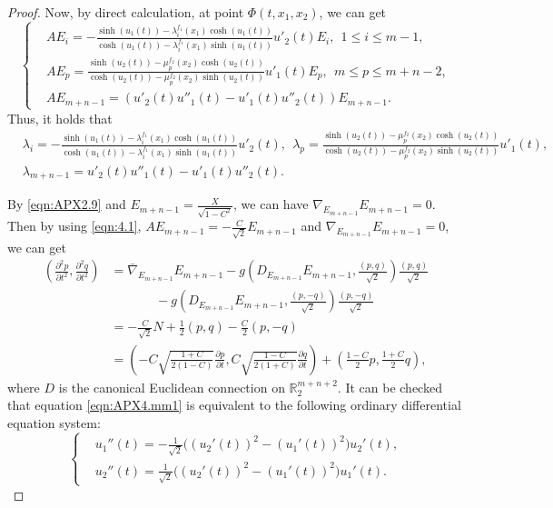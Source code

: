 \documentclass[reqno]{amsart}%
\theoremstyle{definition}
\numberwithin{equation}{section}
\begin{document}
\begin{proof}
Now, by direct calculation, at point $\Phi(t,x_1,x_2)$, we can get 
%
\begin{equation}\label{eqn:apx3.5}
	\left\{\begin{aligned}
		&AE_i=-\tfrac{\sinh(u_1(t))
			-\lambda^{f_1}_i(x_1)\cosh(u_1(t))}
		{\cosh(u_1(t))-\lambda^{f_1}_i(x_1)\sinh(u_1(t))}u'_{2}(t)E_i,\ \ 1\leq i\leq m-1,\\
		&AE_p=\tfrac{\sinh(u_2(t))
			-\mu^{f_2}_p(x_2)\cosh(u_2(t))}
		{\cosh(u_2(t))-\mu^{f_2}_p(x_2)\sinh(u_2(t))}u'_{1}(t)E_p,\ \ m\leq p\leq m+n-2,\\
		&AE_{m+n-1}=\left(u'_{2}(t)u''_{1}(t)-u'_{1}(t)u''_{2}(t)\right)E_{m+n-1}.
	\end{aligned}\right.
\end{equation}
Thus, it holds that 
%
\begin{equation}\label{eqn:apx3.5ss}
\begin{aligned}
&\lambda_i=-\tfrac{\sinh(u_1(t))
	-\lambda^{f_1}_i(x_1)\cosh(u_1(t))}
{\cosh(u_1(t))-\lambda^{f_1}_i(x_1)\sinh(u_1(t))}u'_{2}(t), \ \ \lambda_p=\tfrac{\sinh(u_2(t))
	-\mu^{f_2}_p(x_2)\cosh(u_2(t))}
{\cosh(u_2(t))-\mu^{f_2}_p(x_2)\sinh(u_2(t))}u'_{1}(t),\\
&\lambda_{m+n-1}=u'_{2}(t)u''_{1}(t)-u'_{1}(t)u''_{2}(t).
	\end{aligned}
\end{equation}

By \eqref{eqn:APX2.9} and $E_{m+n-1}=\tfrac{X}{\sqrt{1-C^2}}$, we can have 
 $\nabla_{E_{m+n-1}}{E_{m+n-1}}=0$. 
Then by using \eqref{eqn:4.1}, $AE_{m+n-1}=-\frac{C}{\sqrt{2}}E_{m+n-1}$ and $\nabla_{E_{m+n-1}}{E_{m+n-1}}=0$, 
we can get 
\begin{equation}\label{eqn:APX4.mm1}
	\begin{aligned}
		(\tfrac{\partial^2 p}{\partial t^2},\tfrac{\partial^2 q}{\partial t^2})&%
		=\bar{\nabla}_{E_{m+n-1}}{E_{m+n-1}}-g( D_{E_{m+n-1}}{E_{m+n-1}},\tfrac{(p,q)}{\sqrt{2}})\tfrac{(p,q)}{\sqrt{2}}\\
		&~~~~~~~~~~~~~~~~    -g( D_{E_{m+n-1}}{E_{m+n-1}},\tfrac{(p,-q)}{\sqrt{2}})\tfrac{(p,-q)}{\sqrt{2}}\\
		&=-\tfrac{C}{\sqrt{2}}N+\tfrac{1}{2}(p,q)-\tfrac{C}{2}(p,-q)\\
		&=(-C\sqrt{\tfrac{1+C}{2(1-C)}}\tfrac{\partial p}{\partial t},C\sqrt{\tfrac{1-C}{2(1+C)}}\tfrac{\partial q}{\partial t})+(\tfrac{1-C}{2}p,\tfrac{1+C}{2}q),
	\end{aligned}
\end{equation}
where $D$ is the canonical Euclidean connection on $\mathbb{R}_2^{m+n+2}$. 
It can be checked that equation \eqref{eqn:APX4.mm1} is equivalent to the following 
ordinary differential equation system:
\begin{equation}\label{eqn:APX4.mm1sx}
	\left\{\begin{aligned}
	&u_1''(t)=-\frac{1}{\sqrt{2}}\Big((u_2'(t))^2-(u_1'(t))^2\Big)u_2'(t),\\
	&u_2''(t)=\frac{1}{\sqrt{2}}\Big((u_2'(t))^2-(u_1'(t))^2\Big)u_1'(t). 
\end{aligned}\right.
\end{equation}





\end{proof}
\end{document}
